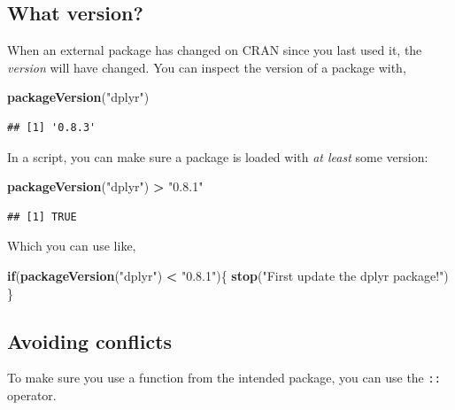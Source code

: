 \documentclass[]{book}
\newenvironment{Shaded}{\begin{snugshade}}{\end{snugshade}}
\newcommand{\ControlFlowTok}[1]{\textcolor[rgb]{0.13,0.29,0.53}{\textbf{#1}}}
\newcommand{\KeywordTok}[1]{\textcolor[rgb]{0.13,0.29,0.53}{\textbf{#1}}}
\newcommand{\NormalTok}[1]{#1}
\newcommand{\OperatorTok}[1]{\textcolor[rgb]{0.81,0.36,0.00}{\textbf{#1}}}
\newcommand{\StringTok}[1]{\textcolor[rgb]{0.31,0.60,0.02}{#1}}
\begin{document}
\hypertarget{what-version}{%
\subsection{What version?}\label{what-version}}

When an external package has changed on CRAN since you last used it, the \emph{version} will have changed. You can inspect the version of a package with,

\begin{Shaded}
\begin{Highlighting}[]
\KeywordTok{packageVersion}\NormalTok{(}\StringTok{"dplyr"}\NormalTok{)}
\end{Highlighting}
\end{Shaded}

\begin{verbatim}
## [1] '0.8.3'
\end{verbatim}

In a script, you can make sure a package is loaded with \emph{at least} some version:

\begin{Shaded}
\begin{Highlighting}[]
\KeywordTok{packageVersion}\NormalTok{(}\StringTok{"dplyr"}\NormalTok{) }\OperatorTok{>}\StringTok{ "0.8.1"}
\end{Highlighting}
\end{Shaded}

\begin{verbatim}
## [1] TRUE
\end{verbatim}

Which you can use like,

\begin{Shaded}
\begin{Highlighting}[]
\ControlFlowTok{if}\NormalTok{(}\KeywordTok{packageVersion}\NormalTok{(}\StringTok{"dplyr"}\NormalTok{) }\OperatorTok{<}\StringTok{ "0.8.1"}\NormalTok{)\{}
  \KeywordTok{stop}\NormalTok{(}\StringTok{"First update the dplyr package!"}\NormalTok{)}
\NormalTok{\}}
\end{Highlighting}
\end{Shaded}

\hypertarget{avoiding-conflicts}{%
\subsection{Avoiding conflicts}\label{avoiding-conflicts}}

To make sure you use a function from the intended package, you can use the \texttt{::} operator.
\end{document}
